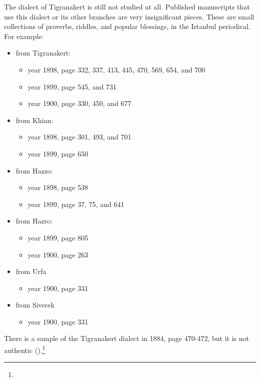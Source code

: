

The dialect of Tigranakert is still not studied at all. Published manuscripts that use this dialect or its other branches are very insignificant pieces. These are small collections of proverbs, riddles, and popular blessings, in the Istanbul  periodical. For example:
\begin{itemize}
	\item from Tigranakert: 
	\begin{itemize}
		\item year 1898, page 332, 337, 413, 445, 470, 569, 654, and 700 
		\item year 1899, page 545, and 731 
		\item year 1900, page 330, 450, and 677 
	\end{itemize}
	\item from Khian: 
	\begin{itemize}
		\item year 1898, page 301, 493, and 701 
		\item year 1899, page 650 
	\end{itemize}
	\item from Hazzo: 
	\begin{itemize}
		\item year 1898, page 538 
		\item year 1899, page 37, 75, and 641 
	\end{itemize}
	\item from Hazro: 
	\begin{itemize}
		\item year 1899, page 805 
		\item year 1900, page 263 
	\end{itemize}
	\item from Urfa 
	\begin{itemize}
		\item year 1900, page 331 
	\end{itemize}
	\item from Siverek 
	\begin{itemize}
		\item year 1900, page 331 
	\end{itemize}
	
\end{itemize}

There is a sample of the Tigranakert dialect in  1884, page 470-472, but it is not authentic ().\footnote{}

